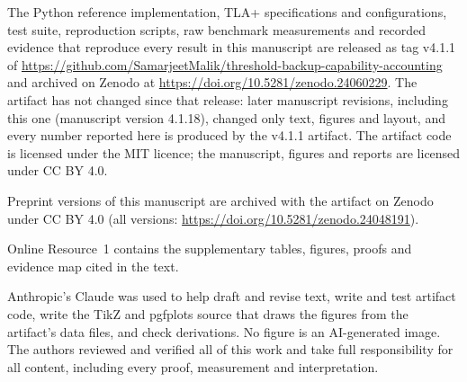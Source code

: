 \documentclass[pdflatex,sn-mathphys-num]{sn-jnl}%
\theoremstyle{plain}
\theoremstyle{definition}
\begin{document}
The Python reference implementation, TLA+ specifications and configurations, test suite, reproduction scripts, raw benchmark measurements and recorded evidence that reproduce every result in this manuscript are released as tag v4.1.1 of \url{https://github.com/SamarjeetMalik/threshold-backup-capability-accounting} and archived on Zenodo at \url{https://doi.org/10.5281/zenodo.24060229}. The artifact has not changed since that release: later manuscript revisions, including this one (manuscript version 4.1.18), changed only text, figures and layout, and every number reported here is produced by the v4.1.1 artifact. The artifact code is licensed under the MIT licence; the manuscript, figures and reports are licensed under CC BY 4.0.

Preprint versions of this manuscript are archived with the artifact on Zenodo under CC BY 4.0 (all versions: \url{https://doi.org/10.5281/zenodo.24048191}).

Online Resource~1 contains the supplementary tables, figures, proofs and evidence map cited in the text.

Anthropic's Claude was used to help draft and revise text, write and test artifact code, write the TikZ and pgfplots source that draws the figures from the artifact's data files, and check derivations. No figure is an AI-generated image. The authors reviewed and verified all of this work and take full responsibility for all content, including every proof, measurement and interpretation.




\end{document}
